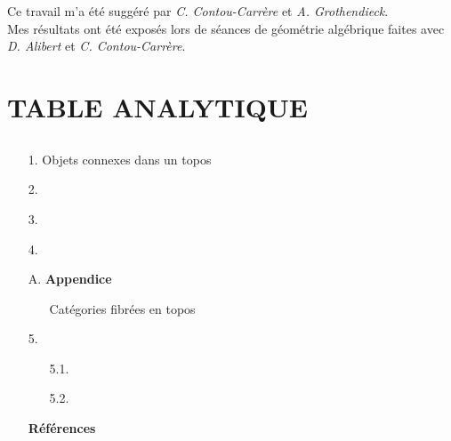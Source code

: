 \documentclass[12pt,twoside]{report} %
\begin{document}
\newpage

\begin{center}
\thispagestyle{empty}
\setlength{\baselineskip}{24pt}
\  \\
{\large
\ \\
[3in] Ce travail m'a été suggéré par \emph{C. Contou-Carrère} et \emph{A. Grothendieck}. \\
Mes résultats ont été exposés lors de séances de géométrie algébrique faites avec \emph{D. Alibert} et \emph{C. Contou-Carrère}. \\
}
\vfill
\end{center}
\vfill

\newpage

\chapter*{TABLE ANALYTIQUE}\thispagestyle{empty}
\section*{}

\begin{itemize}
    \item[1.] Objets connexes dans un topos
    \item[2.]
    \item[3.]
    \item[4.]
    \item[A.] {\bf Appendice}
    \begin{itemize}
        \item[ ] Catégories fibrées en topos 
    \end{itemize}
    \item[5.]
    \begin{itemize}
        \item[5.1.] 
        \item[5.2.] 
    \end{itemize}
    \item[ ] {\bf Références}
\end{itemize}

\newpage
\thispagestyle{empty}
\mbox{}

\setcounter{page}{0}









\newpage
\mbox{}
\thispagestyle{empty}
\end{document}
